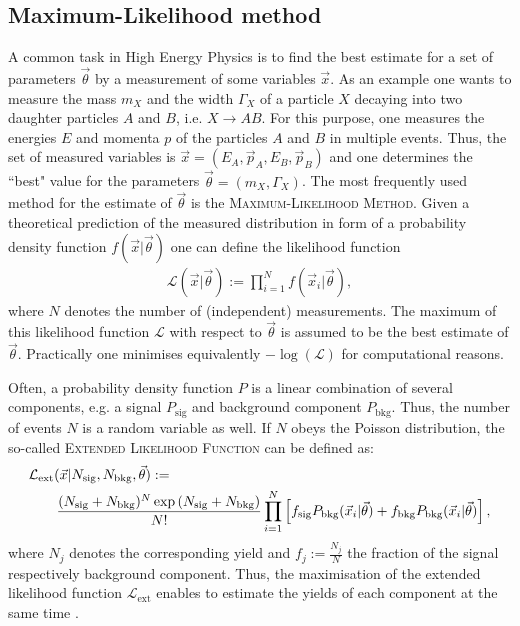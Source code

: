 \subsection{Maximum-Likelihood method}
A common task in High Energy Physics is to find the best estimate for a set of parameters $\vec{\theta}$ by a measurement of some variables $\vec{x}$.
As an example one wants to measure the mass $m_X$  and the width $\Gamma_X$ of a particle $X$ decaying into two daughter particles $A$ and $B$, i.e. $X \to AB$.
For this purpose, one measures the energies $E$ and momenta $p$ of the particles $A$ and $B$ in multiple events.
Thus, the set of measured variables is $\vec{x} = (E_A, \vec{p}_A, E_B, \vec{p}_B)$ and one determines the ``best" value for the parameters $\vec{\theta} = (m_X, \Gamma_X)$. 
The most frequently used method for the estimate of $\vec{\theta}$ is the \textsc{Maximum-Likelihood Method}.
Given a theoretical prediction of the measured distribution in form of a probability density function $f(\vec{x}|\vec{\theta})$ one can define the likelihood function
\begin{align}
    \mathcal{L}(\vec{x}|\vec{\theta}) := \prod_{i=1}^{N} f(\vec{x}_i|\vec{\theta}),
\end{align}
where $N$ denotes the number of (independent) measurements.
The maximum of this likelihood function $\mathcal{L}$ with respect to $\vec{\theta}$ is assumed to be the best estimate of $\vec{\theta}$.
Practically one minimises equivalently $-\log(\mathcal{L})$ for computational reasons.

Often, a probability density function $P$ is a linear combination of several components, e.g. a signal $P_\text{sig}$ and background component $P_\text{bkg}$.
Thus, the number of events $N$ is a random variable as well.
If $N$ obeys the Poisson distribution, the so-called \textsc{Extended Likelihood Function} can be defined as: 
\begin{align}
    &\mathcal{L}_\text{ext}(\vec{x} | \Nsig, \Nbkg, \vec{\theta}) :=  \nonumber \\ 
    &\qquad \frac{(\Nsig+\Nbkg)^N\exp{(\Nsig+\Nbkg)}}{N!} \prod_{i=1}^{N} \left[f_\text{sig}P_\text{bkg}(\vec{x}_i|\vec{\theta}) + f_\text{bkg}P_\text{bkg}(\vec{x}_i|\vec{\theta})\right],
\end{align} 
where $N_j$ denotes the corresponding yield and $f_j:=\frac{N_j}{N}$ the fraction of the signal respectively background component.
Thus, the maximisation of the extended likelihood function $\mathcal{L}_\text{ext}$ enables to estimate the yields of each component at the same time \cite{Lista_Statistics, PDG}.

